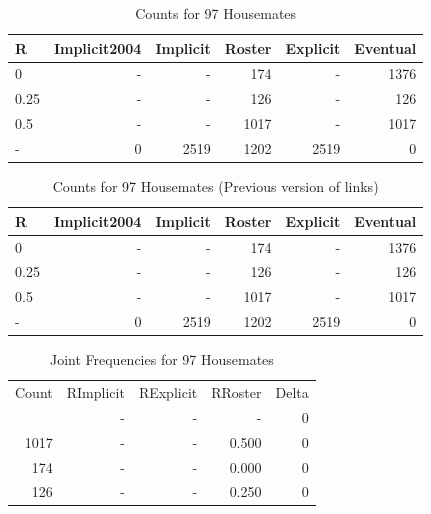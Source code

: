 \documentclass[a4paper]{article}\usepackage[]{graphicx}\usepackage[]{color}
\begin{document}
\begin{table}[ht]
\centering
\begingroup\large
\begin{tabular}{lrrrrr}
  \hline
R & Implicit2004 & Implicit & Roster & Explicit & Eventual \\ 
  \hline
0 & - & - & 174 & - & 1376 \\ 
  0.25 & - & - & 126 & - & 126 \\ 
  0.5 & - & - & 1017 & - & 1017 \\ 
  - &   0 & 2519 & 1202 & 2519 &   0 \\ 
   \hline
\end{tabular}
\endgroup
\caption{Counts for 97 Housemates} 
\end{table}
\begin{table}[ht]
\centering
\begingroup\large
\begin{tabular}{lrrrrr}
  \hline
R & Implicit2004 & Implicit & Roster & Explicit & Eventual \\ 
  \hline
0 & - & - & 174 & - & 1376 \\ 
  0.25 & - & - & 126 & - & 126 \\ 
  0.5 & - & - & 1017 & - & 1017 \\ 
  - &   0 & 2519 & 1202 & 2519 &   0 \\ 
   \hline
\end{tabular}
\endgroup
\caption{Counts for 97 Housemates (Previous version of links)} 
\end{table}



\begin{table}[ht]
\centering
\begin{tabular}{rrrrr}
  \hline
Count & RImplicit & RExplicit & RRoster & Delta \\ 
  \rowcolor{nullColor}  \hline
1202 & - & - & - & 0 \\ 
   \rowcolor{nullColor} 1017 & - & - & 0.500 & 0 \\ 
   \rowcolor{nullColor} 174 & - & - & 0.000 & 0 \\ 
   \rowcolor{nullColor} 126 & - & - & 0.250 & 0 \\ 
   \hline
\end{tabular}
\caption{Joint Frequencies for 97 Housemates} 
\end{table}
\end{document}
